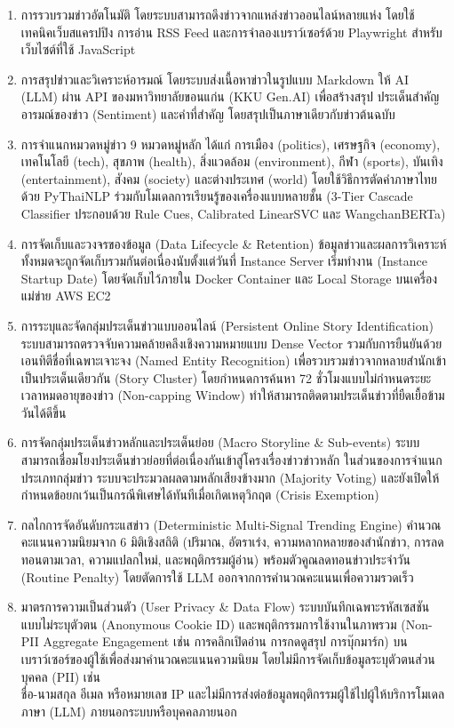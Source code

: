 \begin{enumerate}
    \item การรวบรวมข่าวอัตโนมัติ โดยระบบสามารถดึงข่าวจากแหล่งข่าวออนไลน์หลายแห่ง โดยใช้ \\เทคนิคเว็บสแครปปิง การอ่าน RSS Feed และการจำลองเบราว์เซอร์ด้วย Playwright สำหรับเว็บไซต์ที่ใช้ JavaScript
    \item การสรุปข่าวและวิเคราะห์อารมณ์ โดยระบบส่งเนื้อหาข่าวในรูปแบบ Markdown ให้ AI (LLM) ผ่าน API ของมหาวิทยาลัยขอนแก่น (KKU Gen.AI) เพื่อสร้างสรุป ประเด็นสำคัญ อารมณ์ของข่าว (Sentiment) และคำที่สำคัญ โดยสรุปเป็นภาษาเดียวกับข่าวต้นฉบับ
    \item การจำแนกหมวดหมู่ข่าว 9 หมวดหมู่หลัก ได้แก่ การเมือง (politics), เศรษฐกิจ (economy), เทคโนโลยี (tech), สุขภาพ (health), สิ่งแวดล้อม (environment), กีฬา (sports), บันเทิง (entertainment), สังคม (society) และต่างประเทศ (world) โดยใช้วิธีการตัดคำภาษาไทยด้วย PyThaiNLP ร่วมกับโมเดลการเรียนรู้ของเครื่องแบบหลายชั้น (3-Tier Cascade Classifier ประกอบด้วย Rule Cues, Calibrated LinearSVC และ WangchanBERTa)
    \item การจัดเก็บและวงจรของข้อมูล (Data Lifecycle \& Retention) ข้อมูลข่าวและผลการวิเคราะห์ทั้งหมดจะถูกจัดเก็บรวมกันต่อเนื่องนับตั้งแต่วันที่ Instance Server เริ่มทำงาน (Instance Startup Date) โดยจัดเก็บไว้ภายใน Docker Container และ Local Storage บนเครื่องแม่ข่าย AWS EC2
    \item การระบุและจัดกลุ่มประเด็นข่าวแบบออนไลน์ (Persistent Online Story Identification) ระบบสามารถตรวจจับความคล้ายคลึงเชิงความหมายแบบ Dense Vector รวมกับการยืนยันด้วยเอนทิตีชื่อที่เฉพาะเจาะจง (Named Entity Recognition) เพื่อรวบรวมข่าวจากหลายสำนักเข้าเป็นประเด็นเดียวกัน (Story Cluster) โดยกำหนดการค้นหา 72 ชั่วโมงแบบไม่กำหนดระยะเวลาหมดอายุของข่าว (Non-capping Window) ทำให้สามารถติดตามประเด็นข่าวที่ยืดเยื้อข้ามวันได้ดีขึ้น
    \item การจัดกลุ่มประเด็นข่าวหลักและประเด็นย่อย (Macro Storyline \& Sub-events) ระบบสามารถเชื่อมโยงประเด็นข่าวย่อยที่ต่อเนื่องกันเข้าสู่โครงเรื่องข่าวข่าวหลัก ในส่วนของการจำแนกประเภทกลุ่มข่าว ระบบจะประมวลผลตามหลักเสียงข้างมาก (Majority Voting) และยังเปิดให้กำหนดข้อยกเว้นเป็นกรณีพิเศษได้ทันทีเมื่อเกิดเหตุวิกฤต (Crisis Exemption)
    \item กลไกการจัดอันดับกระแสข่าว (Deterministic Multi-Signal Trending Engine) คำนวณคะแนนความนิยมจาก 6 มิติเชิงสถิติ (ปริมาณ, อัตราเร่ง, ความหลากหลายของสำนักข่าว, การลดทอนตามเวลา, ความแปลกใหม่, และพฤติกรรมผู้อ่าน) พร้อมตัวคูณลดทอนข่าวประจำวัน (Routine Penalty) โดยตัดการใช้ LLM ออกจากการคำนวณคะแนนเพื่อความรวดเร็ว
    \item มาตรการความเป็นส่วนตัว (User Privacy \& Data Flow) ระบบบันทึกเฉพาะรหัสเซสชันแบบไม่ระบุตัวตน (Anonymous Cookie ID) และพฤติกรรมการใช้งานในภาพรวม (Non-PII Aggregate Engagement เช่น การคลิกเปิดอ่าน การกดดูสรุป การบุ๊กมาร์ก) บนเบราว์เซอร์ของผู้ใช้เพื่อส่งมาคำนวณคะแนนความนิยม โดยไม่มีการจัดเก็บข้อมูลระบุตัวตนส่วนบุคคล (PII) เช่น \\ชื่อ-นามสกุล อีเมล หรือหมายเลข IP และไม่มีการส่งต่อข้อมูลพฤติกรรมผู้ใช้ไปผู้ให้บริการโมเดลภาษา (LLM) ภายนอกระบบหรือบุคคลภายนอก

\end{enumerate}
